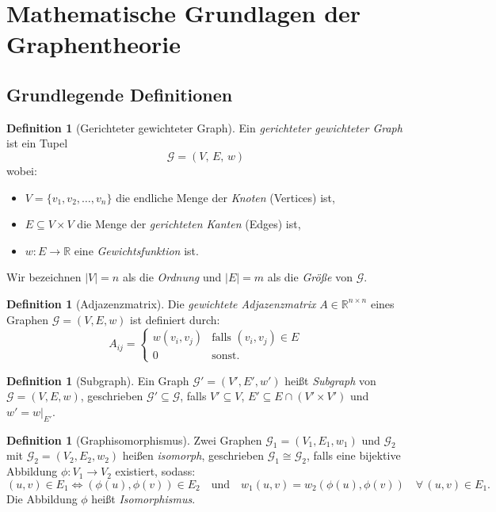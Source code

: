 ﻿\documentclass[12pt,a4paper]{article}
\theoremstyle{plain}
\theoremstyle{definition}
\newtheorem{definition}[theorem]{Definition}
\theoremstyle{remark}
\newcommand{\GG}{\mathcal{G}}
\newcommand{\RR}{\mathbb{R}}
\begin{document}
\section{Mathematische Grundlagen der Graphentheorie}
\label{sec:grundlagen}

\subsection{Grundlegende Definitionen}

\begin{definition}[Gerichteter gewichteter Graph]
\label{def:graph}
Ein \emph{gerichteter gewichteter Graph} ist ein Tupel
\[
  \GG = (V,\, E,\, w)
\]
wobei:
\begin{itemize}
  \item $V = \{v_1, v_2, \ldots, v_n\}$ die endliche Menge der \emph{Knoten} (Vertices) ist,
  \item $E \subseteq V \times V$ die Menge der \emph{gerichteten Kanten} (Edges) ist,
  \item $w : E \to \RR$ eine \emph{Gewichtsfunktion} ist.
\end{itemize}
Wir bezeichnen $|V| = n$ als die \emph{Ordnung} und $|E| = m$ als die \emph{Größe} von $\GG$.
\end{definition}

\begin{definition}[Adjazenzmatrix]
\label{def:adjazenz}
Die \emph{gewichtete Adjazenzmatrix} $A \in \RR^{n \times n}$ eines Graphen $\GG = (V, E, w)$ ist definiert durch:
\[
  A_{ij} = \begin{cases} w(v_i, v_j) & \text{falls } (v_i, v_j) \in E \\ 0 & \text{sonst.} \end{cases}
\]
\end{definition}

\begin{definition}[Subgraph]
\label{def:subgraph}
Ein Graph $\GG' = (V', E', w')$ heißt \emph{Subgraph} von $\GG = (V, E, w)$, geschrieben $\GG' \subseteq \GG$, falls $V' \subseteq V$, $E' \subseteq E \cap (V' \times V')$ und $w' = w|_{E'}$.
\end{definition}

\begin{definition}[Graphisomorphismus]
\label{def:isomorphismus}
Zwei Graphen $\GG_1 = (V_1, E_1, w_1)$ und $\GG_2$ mit $\GG_2 = (V_2, E_2, w_2)$ heißen \emph{isomorph}, geschrieben $\GG_1 \cong \GG_2$, falls eine bijektive Abbildung $\phi: V_1 \to V_2$ existiert, sodass:
\[
  (u,v) \in E_1 \iff (\phi(u), \phi(v)) \in E_2
  \quad \text{und} \quad
  w_1(u,v) = w_2(\phi(u), \phi(v)) \quad \forall\, (u,v) \in E_1.
\]
Die Abbildung $\phi$ heißt \emph{Isomorphismus}.
\end{definition}
\end{document}
